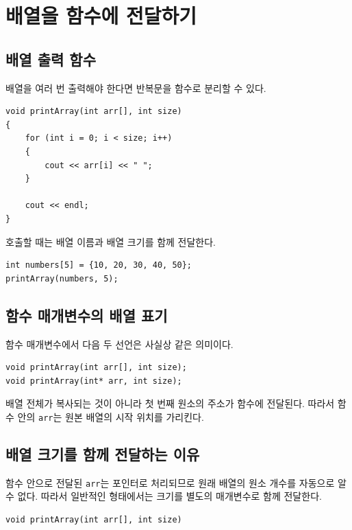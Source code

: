 \documentclass[11pt,a4paper]{article}
\begin{document}
\section{배열을 함수에 전달하기}

\subsection{배열 출력 함수}

배열을 여러 번 출력해야 한다면 반복문을 함수로 분리할 수 있다.

\begin{lstlisting}
void printArray(int arr[], int size)
{
    for (int i = 0; i < size; i++)
    {
        cout << arr[i] << " ";
    }

    cout << endl;
}
\end{lstlisting}

호출할 때는 배열 이름과 배열 크기를 함께 전달한다.

\begin{lstlisting}
int numbers[5] = {10, 20, 30, 40, 50};
printArray(numbers, 5);
\end{lstlisting}

\subsection{함수 매개변수의 배열 표기}

함수 매개변수에서 다음 두 선언은 사실상 같은 의미이다.

\begin{lstlisting}
void printArray(int arr[], int size);
void printArray(int* arr, int size);
\end{lstlisting}

배열 전체가 복사되는 것이 아니라 첫 번째 원소의 주소가 함수에 전달된다. 따라서 함수 안의 \texttt{arr}는 원본 배열의 시작 위치를 가리킨다.

\subsection{배열 크기를 함께 전달하는 이유}

함수 안으로 전달된 \texttt{arr}는 포인터로 처리되므로 원래 배열의 원소 개수를 자동으로 알 수 없다. 따라서 일반적인 형태에서는 크기를 별도의 매개변수로 함께 전달한다.

\begin{lstlisting}
void printArray(int arr[], int size)
\end{lstlisting}
\end{document}
